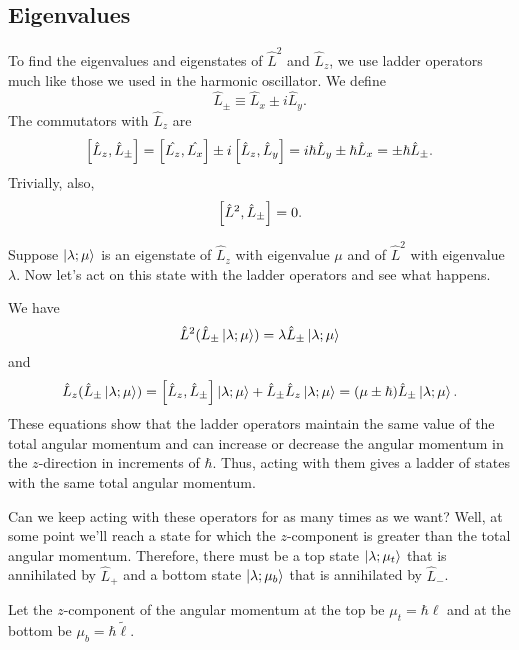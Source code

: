 \subsection*{Eigenvalues}
To find the eigenvalues and eigenstates of $\hat{L}^2$ and $\hat{L}_z$, we use ladder operators much like those we used in the harmonic oscillator. We define 
\begin{equation}
    \hat{L}_{\pm} \equiv \hat{L}_x \pm i\hat{L}_y.
\end{equation}
The commutators with $\hat{L}_z$ are
\begin{equation}
    \left[\hat{L}_z, \hat{L}_{\pm}\right] = \left[\hat{L_z}, \hat{L_x}\right] \pm i \left[\hat{L}_z, \hat{L}_y\right] = i\hbar\hat{L}_y \pm \hbar \hat{L}_x = \pm \hbar \hat{L}_{\pm}.
\end{equation} Trivially, also, 
\begin{equation}
    \left[\hat{L}^2, \hat{L}_\pm\right] = 0.
\end{equation}

Suppose $\left| \lambda; \mu \right\rangle$ is an eigenstate of $\hat{L}_z$ with eigenvalue $\mu$ and of $\hat{L}^2$ with eigenvalue $\lambda$. Now let's act on this state with the ladder operators and see what happens.

We have 
\begin{equation*}
    \hat{L}^2 (\hat{L}_\pm \left| \lambda; \mu \right\rangle) = \lambda \hat{L}_\pm \left| \lambda; \mu \right\rangle
\end{equation*}
and 
\begin{equation*}
    \hat{L}_z(\hat{L}_\pm \left| \lambda; \mu \right\rangle) = \left[\hat{L}_z, \hat{L}_\pm\right] \left| \lambda; \mu \right\rangle + \hat{L}_\pm \hat{L}_z \left|  \lambda; \mu \right\rangle = (\mu \pm \hbar) \hat{L}_\pm \left| \lambda; \mu \right\rangle.
\end{equation*}
These equations show that the ladder operators maintain the same value of the total angular momentum and can increase or decrease the angular momentum in the $z$-direction in increments of $\hbar$. Thus, acting with them gives a ladder of states with the same total angular momentum.

Can we keep acting with these operators for as many times as we want? Well, at some point we'll reach a state for which the $z$-component is greater than the total angular momentum. Therefore, there must be a top state $\left| \lambda; \mu_t \right\rangle$ that is annihilated by $\hat{L}_+$ and a bottom state $\left| \lambda; \mu_b \right\rangle$ that is annihilated by $\hat{L}_-$.

Let the $z$-component of the angular momentum at the top be $\mu_t = \hbar \ell$ and at the bottom be $\mu_b = \hbar \tilde{\ell}$. 


